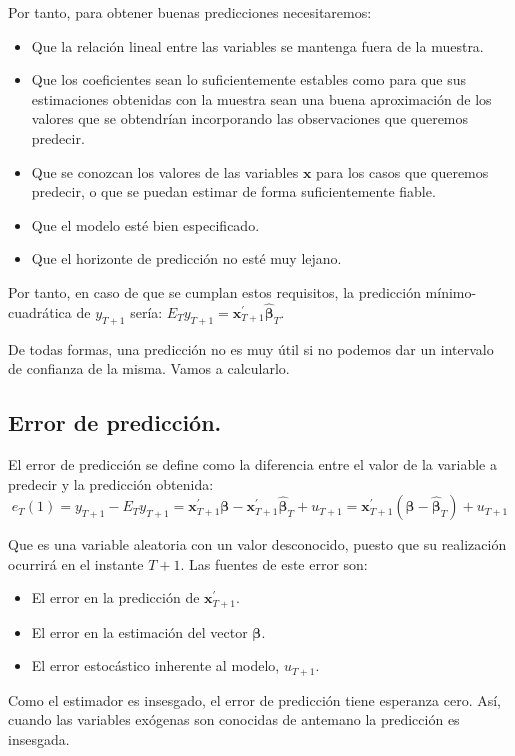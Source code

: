 Por tanto, para obtener buenas predicciones necesitaremos:
\begin{itemize}
\item Que la relaci\'on lineal entre las variables se mantenga fuera de la
muestra.
\item Que los coeficientes sean lo suficientemente estables como para que
sus estimaciones obtenidas con la muestra sean una buena aproximaci\'on
de los valores que se obtendr\'ian incorporando las observaciones que
queremos predecir.
\item Que se conozcan los valores de las variables $\boldsymbol{x}$ para
los casos que queremos predecir, o que se puedan estimar de forma
suficientemente fiable.
\item Que el modelo est\'e bien especificado.
\item Que el horizonte de predicci\'on no est\'e muy lejano.
\end{itemize}
Por tanto, en caso de que se cumplan estos requisitos, la predicci\'on
m\'inimo-cuadr\'atica de $y_{T+1}$ ser\'ia: $E_{T}y_{T+1}=\boldsymbol{x}^{\prime}_{T+1}\hat{\boldsymbol{\beta}}_{T}$.

De todas formas, una predicci\'on no es muy \'util si no podemos dar un
intervalo de confianza de la misma. Vamos a calcularlo.


\subsection{Error de predicci\'on.}

El error de predicci\'on se define como la diferencia entre el valor
de la variable a predecir y la predicci\'on obtenida:
\[
e_{T}(1)=y_{T+1}-E_{T}y_{T+1}=\boldsymbol{x}^{\prime}_{T+1}\boldsymbol{\beta}-\boldsymbol{x}^{\prime}_{T+1}\hat{\boldsymbol{\beta}}_{T}+u_{T+1}=\boldsymbol{x}^{\prime}_{T+1}\left(\boldsymbol{\beta}-\hat{\boldsymbol{\beta}}_{T}\right)+u_{T+1}
\]


Que es una variable aleatoria con un valor desconocido, puesto que
su realizaci\'on ocurrir\'a en el instante $T+1$. Las fuentes de este
error son:
\begin{itemize}
\item El error en la predicci\'on de $\boldsymbol{x}^{\prime}_{T+1}$.
\item El error en la estimaci\'on del vector $\boldsymbol{\beta}$.
\item El error estoc\'astico inherente al modelo, $u_{T+1}$.
\end{itemize}
Como el estimador es insesgado, el error de predicci\'on tiene esperanza
cero. As\'i, cuando las variables ex\'ogenas son conocidas de antemano
la predicci\'on es insesgada.

